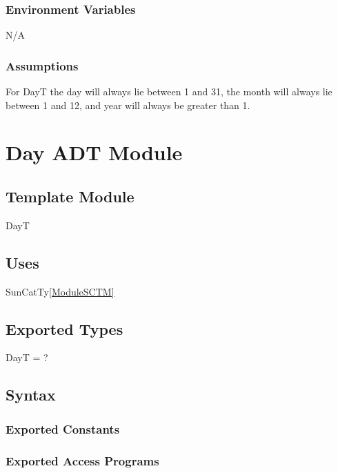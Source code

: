 \documentclass[12pt, titlepage]{article}
\begin{document}
\subsubsection{Environment Variables}

N/A\\

\subsubsection{Assumptions}
For DayT the day will always lie between 1 and 31, the month will always lie between 1 and 12, and year will always be greater than 1.

\section{Day ADT Module} \label{ModuleADTD} 

\subsection{Template Module}
DayT

\subsection{Uses}

SunCatTy\ref{ModuleSCTM} \\

\subsection{Exported Types}

DayT = ? \\

\subsection{Syntax}

\subsubsection{Exported Constants}


\subsubsection{Exported Access Programs}
\end{document}
